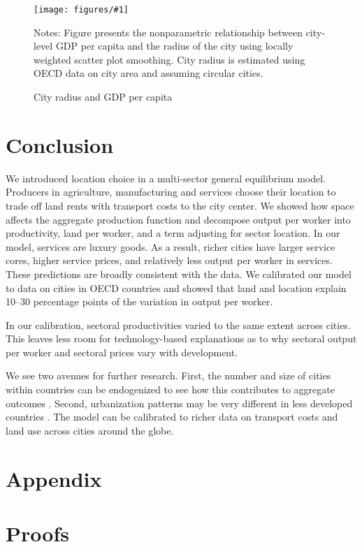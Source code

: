 \documentclass[12pt]{article}
\newcommand{\dofigure}[3]{\begin{figure}
\begin{centering}
\texttt{[image: figures/\#1]}
  \caption{#2\label{fig:#1}}
\end{centering}

\noindent \footnotesize{#3}
\end{figure}}
\begin{document}
\dofigure{city_level_inputs/city_radius}{City radius and GDP per capita}{Notes: Figure presents the nonparametric relationship between city-level GDP per capita and the radius of the city using locally weighted scatter plot smoothing. City radius is estimated using OECD data on city area and assuming circular cities.}


\section{Conclusion}
We introduced location choice in a multi-sector general equilibrium model. Producers in agriculture, manufacturing and services choose their location to trade off land rents with transport costs to the city center. We showed how space affects the aggregate production function and decompose output per worker into productivity, land per worker, and a term adjusting for sector location. In our model, services are luxury goods. As a result, richer cities have larger service cores, higher service prices, and relatively less output per worker in services. These predictions are broadly consistent with the data. We calibrated our model to data on cities in OECD countries and showed that land and location explain 10--30 percentage points of the variation in output per worker.

In our calibration, sectoral productivities varied to the same extent across cities. This leaves less room for technology-based explanations as to why sectoral output per worker and sectoral prices vary with development. 

We see two avenues for further research. First, the number and size of cities within countries can be endogenized to see how this contributes to aggregate outcomes \cite{Desmet2013,Ramondo2016-qy}. Second, urbanization patterns may be very different in less developed countries \cite{Glaeser2014-gd,Harari2016-cx}. The model can be calibrated to richer data on transport costs and land use across cities around the globe.
\clearpage




\clearpage

\appendix
\section*{Appendix}
\section{Proofs}
\end{document}
